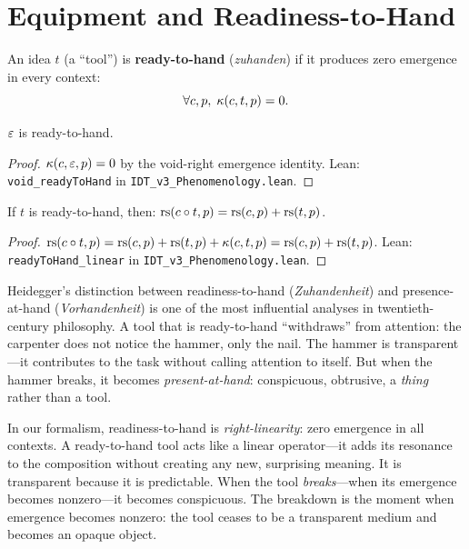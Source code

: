 \section{Equipment and Readiness-to-Hand}

\begin{definition}
\label{def:ready-to-hand}
An idea $t$ (a ``tool'') is \textbf{ready-to-hand} (\textit{zuhanden}) if it
produces zero emergence in every context:
\[
\forall c, p,\; \kappa(c, t, p) = 0.
\]
\end{definition}

\begin{theorem}
\label{thm:void-ready}
$\varepsilon$ is ready-to-hand.
\end{theorem}

\begin{proof}
$\kappa(c, \varepsilon, p) = 0$ by the void-right emergence identity.
Lean: \texttt{void\_readyToHand} in \texttt{IDT\_v3\_Phenomenology.lean}.
\end{proof}

\begin{theorem}
\label{thm:ready-linear}
If $t$ is ready-to-hand, then:
$\mathrm{rs}(c \circ t, p) = \mathrm{rs}(c, p) + \mathrm{rs}(t, p)$.
\end{theorem}

\begin{proof}
$\mathrm{rs}(c \circ t, p) = \mathrm{rs}(c,p) + \mathrm{rs}(t,p) + \kappa(c,t,p) = \mathrm{rs}(c,p) + \mathrm{rs}(t,p)$.
Lean: \texttt{readyToHand\_linear} in \texttt{IDT\_v3\_Phenomenology.lean}.
\end{proof}

\begin{interpretation}
\label{interp:ready-to-hand}
Heidegger's distinction between readiness-to-hand (\textit{Zuhandenheit})
and presence-at-hand (\textit{Vorhandenheit}) is one of the most influential
analyses in twentieth-century philosophy. A tool that is ready-to-hand
``withdraws'' from attention: the carpenter does not notice the hammer, only
the nail. The hammer is transparent---it contributes to the task without
calling attention to itself. But when the hammer breaks, it becomes
\emph{present-at-hand}: conspicuous, obtrusive, a \emph{thing} rather than
a tool.

In our formalism, readiness-to-hand is \emph{right-linearity}: zero emergence
in all contexts. A ready-to-hand tool acts like a linear operator---it adds its
resonance to the composition without creating any new, surprising meaning. It is
transparent because it is predictable. When the tool \emph{breaks}---when its
emergence becomes nonzero---it becomes conspicuous. The breakdown is the moment
when emergence becomes nonzero: the tool ceases to be a transparent medium and
becomes an opaque object.
\end{interpretation}

